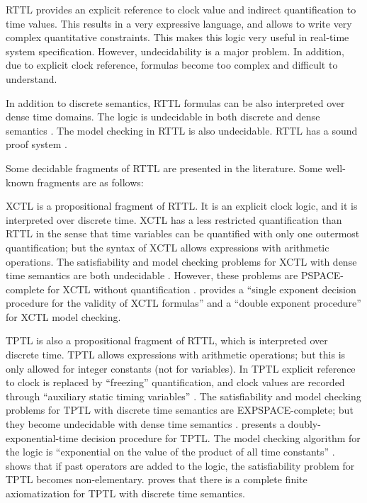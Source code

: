 \documentclass[11pt]{article}
\begin{document}
RTTL provides an explicit reference to clock value and indirect quantification to time values. This results in a very expressive language, and allows to write very complex quantitative constraints. This makes this logic very useful in real-time system specification. However, undecidability is a major problem. In addition, due to explicit clock reference, formulas become too complex and difficult to  understand. 

In addition to  discrete semantics, RTTL formulas can be also interpreted over dense time domains. The logic is undecidable in both discrete and dense semantics \cite{AH90}. The model checking in RTTL is also undecidable. RTTL has a sound proof system \cite{Ost89}.

Some decidable fragments of RTTL are presented in the literature. Some well-known fragments are as follows:

XCTL \cite{HLP90} is a propositional fragment of RTTL. It is an explicit clock logic, and it is interpreted over discrete time. XCTL has a less restricted quantification than RTTL in the sense that time variables can be quantified with only one outermost quantification; but the syntax of XCTL allows expressions with arithmetic operations. The satisfiability and model checking problems for XCTL with dense time semantics are both undecidable  \cite{HLP90}. However, these problems are PSPACE-complete for XCTL without quantification \cite{HLP90}. \cite{HLP90} provides a ``single exponent decision procedure for the validity of XCTL formulas'' and a ``double exponent procedure'' for XCTL model checking. 

TPTL \cite{AH90} is also a propositional fragment of RTTL, which is interpreted over discrete time. TPTL allows expressions with arithmetic operations; but this is only allowed for integer constants (not for variables). In TPTL explicit reference to clock is replaced by ``freezing'' quantification, and clock values are recorded through ``auxiliary static timing variables'' \cite{Ost92}.  The satisfiability and model checking problems for TPTL with discrete time semantics are EXPSPACE-complete; but they become undecidable with dense time semantics \cite{AH89}. \cite{AH89} presents a doubly-exponential-time decision procedure for TPTL. The model checking algorithm for the logic is ``exponential on the value of the product of all time constants'' \cite{Ost92}. \cite{AH90} shows that if past operators are added to the logic, the satisfiability problem for TPTL becomes non-elementary.  \cite{Hen91} proves that there is a complete finite axiomatization for TPTL with discrete time semantics.
\end{document}
